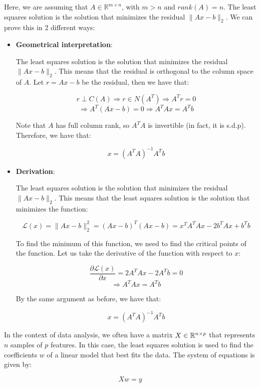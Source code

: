 Here, we are assuming that $A \in \mathbb{R}^{m \times n}$, with $m > n$ and $rank(A) = n$. The least squares solution
is the solution that minimizes the residual $\|A x - b\|_2$. We can prove this in 2 different ways:

\begin{itemize}
    \item \textbf{Geometrical interpretation}:
    
    The least squares solution is the solution that minimizes the residual $\|A x - b\|_2$. This means that the residual
is orthogonal to the column space of $A$. Let $r = A x - b$ be the residual, then we have that:

$$r \perp C(A) \Rightarrow r \in N(A^T) \Rightarrow A^T r = 0$$
$$\Rightarrow A^T (A x - b) = 0 \Rightarrow A^T A x = A^T b$$

Note that $A$ has full column rank, so $A^T A$ is invertible (in fact, it is s.d.p). Therefore, we have that:

$$x = (A^T A)^{-1} A^T b$$

    \item \textbf{Derivation}:
    
    The least squares solution is the solution that minimizes the residual $\|A x - b\|_2$. This means that the least squares
    solution is the solution that minimizes the function:
    
    $$\mathcal{L}(x) = \|A x - b\|_2^2 = (A x - b)^T (A x - b) = x^T A^T A x - 2 b^T A x + b^T b$$
    
    To find the minimum of this function, we need to find the critical points of the function. Let us take the derivative
    of the function with respect to $x$:
    
    $$\frac{\partial \mathcal{L}(x)}{\partial x} = 2 A^T A x - 2 A^T b = 0$$
    $$\Rightarrow A^T A x = A^T b$$
    
    By the same argument as before, we have that:
    
    $$x = (A^T A)^{-1} A^T b$$

\end{itemize}

In the context of data analysis, we often have a matrix $X \in \mathbb{R}^{n \times p}$ that represents $n$ samples of $p$ features.
In this case, the least squares solution is used to find the coefficients $w$ of a linear model that best fits the data. The
system of equations is given by:

\begin{equation}
    X w = y
\end{equation}

